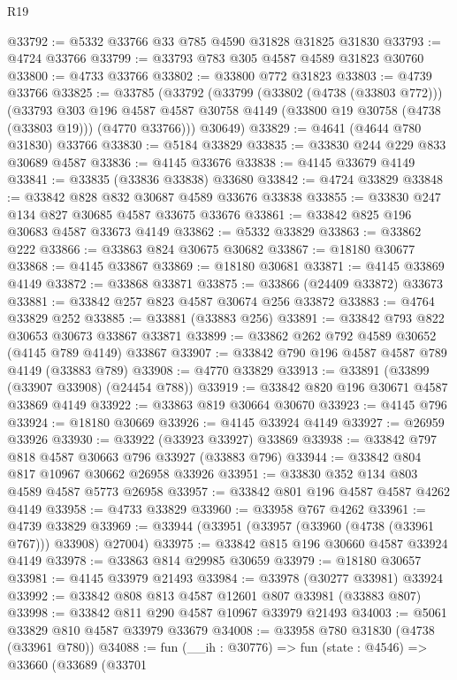 \begin{lexlean}{R19}
\begin{coremodule}
@33792 := @5332 @33766 @33 @785 @4590 @31828 @31825 @31830
@33793 := @4724 @33766
@33799 := @33793 @783 @305 @4587 @4589 @31823 @30760
@33800 := @4733 @33766
@33802 := @33800 @772 @31823
@33803 := @4739 @33766
@33825 := @33785
    (@33792
      (@33799
        (@33802 (@4738 (@33803 @772)))
        (@33793
          @303
          @196
          @4587
          @4587
          @30758
          @4149
          (@33800 @19 @30758 (@4738 (@33803 @19)))
          (@4770 @33766)))
      @30649)
@33829 := @4641 (@4644 @780 @31830) @33766
@33830 := @5184 @33829
@33835 := @33830 @244 @229 @833 @30689 @4587
@33836 := @4145 @33676
@33838 := @4145 @33679 @4149
@33841 := @33835 (@33836 @33838) @33680
@33842 := @4724 @33829
@33848 := @33842 @828 @832 @30687 @4589 @33676 @33838
@33855 := @33830 @247 @134 @827 @30685 @4587 @33675 @33676
@33861 := @33842 @825 @196 @30683 @4587 @33673 @4149
@33862 := @5332 @33829
@33863 := @33862 @222
@33866 := @33863 @824 @30675 @30682
@33867 := @18180 @30677
@33868 := @4145 @33867
@33869 := @18180 @30681
@33871 := @4145 @33869 @4149
@33872 := @33868 @33871
@33875 := @33866 (@24409 @33872) @33673
@33881 := @33842 @257 @823 @4587 @30674 @256 @33872
@33883 := @4764 @33829 @252
@33885 := @33881 (@33883 @256)
@33891 := @33842 @793 @822 @30653 @30673 @33867 @33871
@33899 := @33862 @262 @792 @4589 @30652 (@4145 @789 @4149) @33867
@33907 := @33842 @790 @196 @4587 @4587 @789 @4149 (@33883 @789)
@33908 := @4770 @33829
@33913 := @33891 (@33899 (@33907 @33908) (@24454 @788))
@33919 := @33842 @820 @196 @30671 @4587 @33869 @4149
@33922 := @33863 @819 @30664 @30670
@33923 := @4145 @796
@33924 := @18180 @30669
@33926 := @4145 @33924 @4149
@33927 := @26959 @33926
@33930 := @33922 (@33923 @33927) @33869
@33938 := @33842 @797 @818 @4587 @30663 @796 @33927 (@33883 @796)
@33944 := @33842 @804 @817 @10967 @30662 @26958 @33926
@33951 := @33830 @352 @134 @803 @4589 @4587 @5773 @26958
@33957 := @33842 @801 @196 @4587 @4587 @4262 @4149
@33958 := @4733 @33829
@33960 := @33958 @767 @4262
@33961 := @4739 @33829
@33969 := @33944 (@33951 (@33957 (@33960 (@4738 (@33961 @767))) @33908) @27004)
@33975 := @33842 @815 @196 @30660 @4587 @33924 @4149
@33978 := @33863 @814 @29985 @30659
@33979 := @18180 @30657
@33981 := @4145 @33979 @21493
@33984 := @33978 (@30277 @33981) @33924
@33992 := @33842 @808 @813 @4587 @12601 @807 @33981 (@33883 @807)
@33998 := @33842 @811 @290 @4587 @10967 @33979 @21493
@34003 := @5061 @33829 @810 @4587 @33979 @33679
@34008 := @33958 @780 @31830 (@4738 (@33961 @780))
@34088 := fun (__ih : @30776) =>
  fun (state : @4546) =>
  @33660
    (@33689
      (@33701

\end{coremodule}
\end{lexlean}
